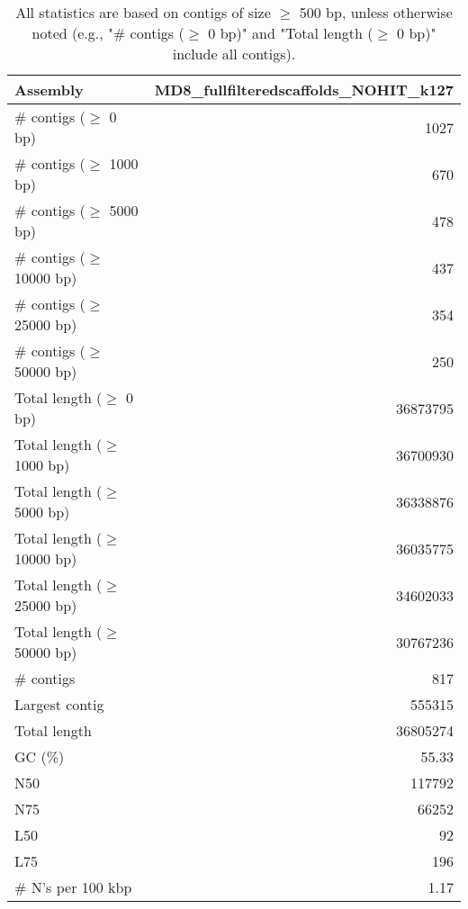 \documentclass[12pt,a4paper]{article}
\begin{document}
\begin{table}[ht]
\begin{center}
\caption{All statistics are based on contigs of size $\geq$ 500 bp, unless otherwise noted (e.g., "\# contigs ($\geq$ 0 bp)" and "Total length ($\geq$ 0 bp)" include all contigs).}
\begin{tabular}{|l*{1}{|r}|}
\hline
Assembly & MD8\_fullfilteredscaffolds\_NOHIT\_k127 \\ \hline
\# contigs ($\geq$ 0 bp) & 1027 \\ \hline
\# contigs ($\geq$ 1000 bp) & 670 \\ \hline
\# contigs ($\geq$ 5000 bp) & 478 \\ \hline
\# contigs ($\geq$ 10000 bp) & 437 \\ \hline
\# contigs ($\geq$ 25000 bp) & 354 \\ \hline
\# contigs ($\geq$ 50000 bp) & 250 \\ \hline
Total length ($\geq$ 0 bp) & 36873795 \\ \hline
Total length ($\geq$ 1000 bp) & 36700930 \\ \hline
Total length ($\geq$ 5000 bp) & 36338876 \\ \hline
Total length ($\geq$ 10000 bp) & 36035775 \\ \hline
Total length ($\geq$ 25000 bp) & 34602033 \\ \hline
Total length ($\geq$ 50000 bp) & 30767236 \\ \hline
\# contigs & 817 \\ \hline
Largest contig & 555315 \\ \hline
Total length & 36805274 \\ \hline
GC (\%) & 55.33 \\ \hline
N50 & 117792 \\ \hline
N75 & 66252 \\ \hline
L50 & 92 \\ \hline
L75 & 196 \\ \hline
\# N's per 100 kbp & 1.17 \\ \hline
\end{tabular}
\end{center}
\end{table}
\end{document}
